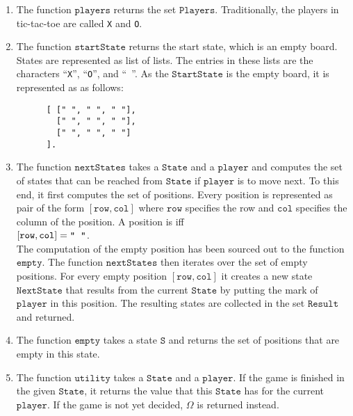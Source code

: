 \begin{enumerate}
\item The function $\texttt{players}$ returns the set $\texttt{Players}$.  Traditionally, the players in
      tic-tac-toe are called \texttt{X} and \texttt{O}.
\item The function $\texttt{startState}$ returns the start state, which is an empty board.
      States are represented as list of lists.  The entries in these lists are the characters 
      ``\texttt{X}'', ``\texttt{O}'', and ``\texttt{ }''.
      As the  $\texttt{StartState}$ is the empty board, it is represented as as follows:
      \begin{Verbatim}
      [ [" ", " ", " "], 
        [" ", " ", " "], 
        [" ", " ", " "]
      ].     
      \end{Verbatim}
\item The function $\texttt{nextStates}$ takes a $\texttt{State}$ and a $\texttt{player}$ and computes the set
      of states that can be reached from $\texttt{State}$ if $\texttt{player}$ is to move next.
      To this end, it first computes the set of  positions.  Every position is represented as pair of the
      form $[\texttt{row}, \texttt{col}]$ where $\texttt{row}$ specifies the row and $\texttt{col}$ specifies
      the column of the position.  A position is  iff
      \\[0.2cm]
      \hspace*{1.3cm}
      $[\texttt{row}, \texttt{col}] = \texttt{\symbol{34}\;\;\symbol{34}}$.
      \\[0.2cm]
      The computation of the empty position has been sourced out to the function $\texttt{empty}$.
      The function $\texttt{nextStates}$ then iterates over the set of empty positions. For every 
      empty position $[\texttt{row}, \texttt{col}]$ it creates a new state $\texttt{NextState}$ that results
      from the current $\texttt{State}$ by putting the mark of $\texttt{player}$ in this position.  
      The resulting states are collected in the set $\texttt{Result}$ and returned.
\item The function $\texttt{empty}$ takes a state $\texttt{S}$ and returns the set of positions that are empty
      in this state.
\item The function $\texttt{utility}$ takes a $\texttt{State}$ and a $\texttt{player}$.  If the game is 
      finished in the given $\texttt{State}$, it returns the value that this $\texttt{State}$ has for the
      current $\texttt{player}$.  If the game is not yet decided, $\Omega$ is returned instead.
 

\end{enumerate}
